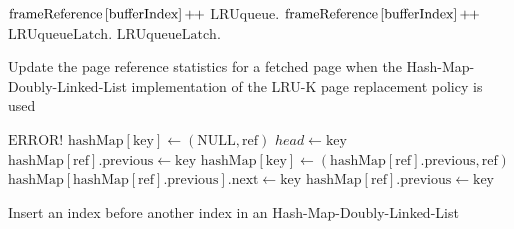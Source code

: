 \begin{@empty}
\begin{algorithm}[h!]
\begin{algorithmic}[1]
                \EndFor
                    \State $\text{frameReference}\left[\text{bufferIndex}\right]\mathord{\mathord{+}\hspace*{-1pt}\mathord{+}}$
                \EndIf
                \State $\text{LRUqueue}$.
                \State $\text{frameReference}\left[\text{bufferIndex}\right]\mathord{\mathord{+}\hspace*{-1pt}\mathord{+}}$
                \State $\text{LRUqueueLatch}.$
                \State $\text{LRUqueueLatch}.$
            \EndFunction
        \end{algorithmic}
        \vspace{1em}
        \caption[{\footnotesize \textbf{function} \textsc{insert}} of Hash-Map-Doubly-Linked-List LRU-K]{Update the page reference statistics for a fetched page when the Hash-Map-Doubly-Linked-List implementation of the LRU-K page replacement policy is used \vspace{-1em}}
        \label{alg:hashmapdoublylinkedlistlrukinsert}
    \end{algorithm}
\end{@empty}

\begin{@empty}
    \begin{algorithm}[h!]
        \scriptsize
        \begin{algorithmic}[1]
                    \State \Return $\text{ERROR!}$
                        \State $\text{hashMap}\left[\text{key}\right] \gets \left(\text{NULL}, \text{ref}\right)$
                        \State $head \gets \text{key}$
                        \State $\text{hashMap}\left[\text{ref}\right].\text{previous} \gets \text{key}$
                    \Else
                        \State $\text{hashMap}\left[\text{key}\right] \gets \left(\text{hashMap}\left[\text{ref}\right].\text{previous}, \text{ref}\right)$
                        \State $\text{hashMap}\left[\text{hashMap}\left[\text{ref}\right].\text{previous}\right].\text{next} \gets \text{key}$
                        \State $\text{hashMap}\left[\text{ref}\right].\text{previous} \gets \text{key}$
                    \EndIf
                \EndIf
            \EndFunction
        \end{algorithmic}
        \vspace{1em}
        \caption[{\footnotesize \textbf{function} \textsc{insertBefore}} of Hash-Map-Doubly-Linked-List]{Insert an index before another index in an Hash-Map-Doubly-Linked-List}
        \label{alg:hashmapdoublylinkedlistinsertbefore}
    \end{algorithm}
\end{@empty}

